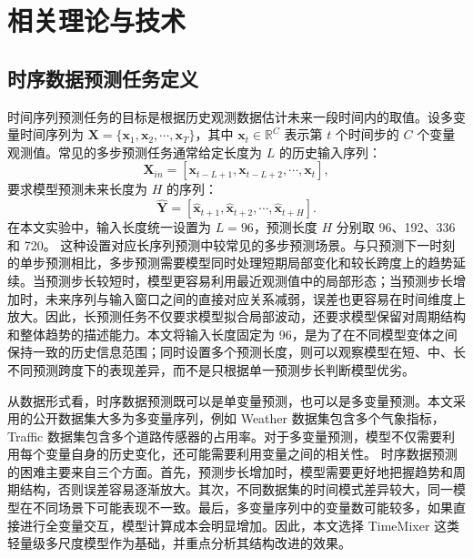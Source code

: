 
\chapter{相关理论与技术}

\section{时序数据预测任务定义}

时间序列预测任务的目标是根据历史观测数据估计未来一段时间内的取值。设多变量时间序列为 $\mathbf{X}=\{\mathbf{x}_1,\mathbf{x}_2,\cdots,\mathbf{x}_T\}$，其中 $\mathbf{x}_t \in \mathbb{R}^{C}$ 表示第 $t$ 个时间步的 $C$ 个变量观测值。常见的多步预测任务通常给定长度为 $L$ 的历史输入序列：
\begin{equation}
    \mathbf{X}_{in} = [\mathbf{x}_{t-L+1}, \mathbf{x}_{t-L+2}, \cdots, \mathbf{x}_{t}],
\end{equation}
要求模型预测未来长度为 $H$ 的序列：
\begin{equation}
    \hat{\mathbf{Y}} = [\hat{\mathbf{x}}_{t+1}, \hat{\mathbf{x}}_{t+2}, \cdots, \hat{\mathbf{x}}_{t+H}].
\end{equation}
在本文实验中，输入长度统一设置为 $L=96$，预测长度 $H$ 分别取 96、192、336 和 720。
这种设置对应长序列预测中较常见的多步预测场景。与只预测下一时刻的单步预测相比，多步预测需要模型同时处理短期局部变化和较长跨度上的趋势延续。当预测步长较短时，模型更容易利用最近观测值中的局部形态；当预测步长增加时，未来序列与输入窗口之间的直接对应关系减弱，误差也更容易在时间维度上放大。因此，长预测任务不仅要求模型拟合局部波动，还要求模型保留对周期结构和整体趋势的描述能力。本文将输入长度固定为 96，是为了在不同模型变体之间保持一致的历史信息范围；同时设置多个预测长度，则可以观察模型在短、中、长不同预测跨度下的表现差异，而不是只根据单一预测步长判断模型优劣。

从数据形式看，时序数据预测既可以是单变量预测，也可以是多变量预测。本文采用的公开数据集大多为多变量序列，例如 Weather 数据集包含多个气象指标，Traffic 数据集包含多个道路传感器的占用率。对于多变量预测，模型不仅需要利用每个变量自身的历史变化，还可能需要利用变量之间的相关性。
时序数据预测的困难主要来自三个方面。首先，预测步长增加时，模型需要更好地把握趋势和周期结构，否则误差容易逐渐放大。其次，不同数据集的时间模式差异较大，同一模型在不同场景下可能表现不一致。最后，多变量序列中的变量数可能较多，如果直接进行全变量交互，模型计算成本会明显增加。因此，本文选择 TimeMixer 这类轻量级多尺度模型作为基础，并重点分析其结构改进的效果。

